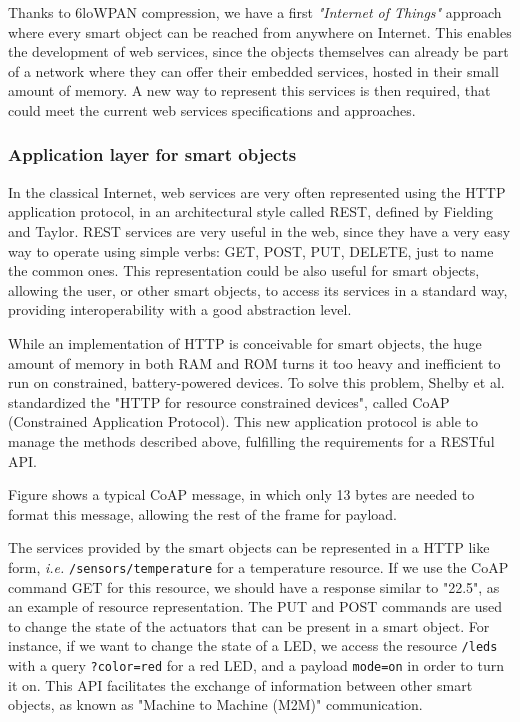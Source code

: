 Thanks to 6loWPAN compression, we have a first \textit{"Internet of Things"} approach where every smart object can be reached from anywhere on Internet.
This enables the development of web services, since the objects themselves can already be part of a network where they can offer their embedded services, hosted in their small amount of memory.
A new way to represent this services is then required, that could meet the current web services specifications and approaches.

\subsubsection{Application layer for smart objects}
In the classical Internet, web services are very often represented using the HTTP application protocol\cite{rfc2616}, in an architectural style called REST, defined by Fielding and Taylor\cite{Fielding02REST}.
REST services are very useful in the web, since they have a very easy way to operate using simple verbs: GET, POST, PUT, DELETE, just to name the common ones.
This representation could be also useful for smart objects, allowing the user, or other smart objects, to access its services in a standard way, providing interoperability with a good abstraction level.

While an implementation of HTTP is conceivable for smart objects, the huge amount of memory in both RAM and ROM turns it too heavy and inefficient to run on constrained, battery-powered devices\cite{Shelby10EWS}.
To solve this problem, Shelby et al. standardized the "HTTP for resource constrained devices"\cite{rfc7252}, called CoAP (Constrained Application Protocol).
This new application protocol is able to manage the methods described above, fulfilling the requirements for a RESTful API.


Figure  shows a typical CoAP message, in which only 13 bytes are needed to format this message, allowing the rest of the frame for payload.

The services provided by the smart objects can be represented in a HTTP like form, \textit{i.e.} \texttt{/sensors/temperature} for a temperature resource. If we use the CoAP command GET for this resource, we should have a response similar to "22.5", as an example of resource representation.
The PUT and POST commands are used to change the state of the actuators that can be present in a smart object.
For instance, if we want to change the state of a LED, we access the resource \texttt{/leds} with a query \texttt{?color=red} for a red LED, and a payload \texttt{mode=on} in order to turn it on.
This API facilitates the exchange of information between other smart objects, as known as "Machine to Machine (M2M)" communication.

